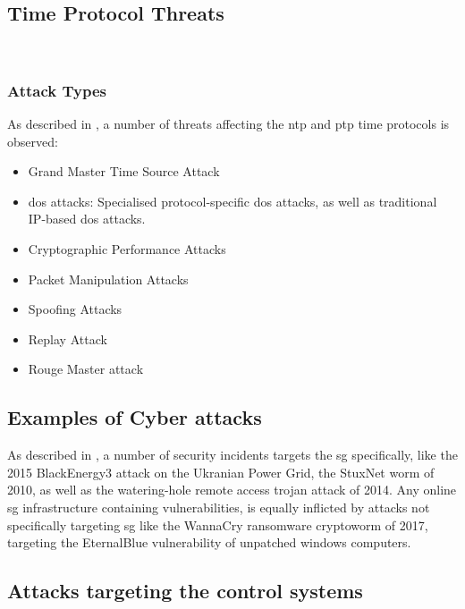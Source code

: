 \subsection{Time  Protocol Threats}








\
\subsubsection{Attack Types}
As described in \cite{ullmann2009delay}, a number of threats affecting the \acrshort{ntp} and  \acrshort{ptp} time protocols is observed:



\begin{itemize}
    \item Grand Master Time Source Attack
    \item \acrfull{dos} attacks: Specialised protocol-specific \acrshort{dos} attacks, as well as traditional IP-based \acrshort{dos} attacks.
    \item Cryptographic Performance Attacks
    \item Packet Manipulation Attacks
    \item Spoofing Attacks
    \item Replay Attack   
    \item Rouge Master attack 
\end{itemize}



\subsection{Examples of Cyber attacks}
As described in \cite{sundararajan2019survey}, a number of security incidents targets the \acrshort{sg} specifically, like the 2015 BlackEnergy3 attack on the Ukranian  Power Grid, the StuxNet worm of 2010, as well as the watering-hole remote access trojan attack of 2014. 
Any online \acrshort{sg} infrastructure containing vulnerabilities, is equally inflicted by attacks not specifically targeting \acrfull{sg} like the WannaCry ransomware cryptoworm of 2017, targeting the EternalBlue vulnerability of unpatched windows computers.\\ 



\subsection{Attacks targeting the control systems}


